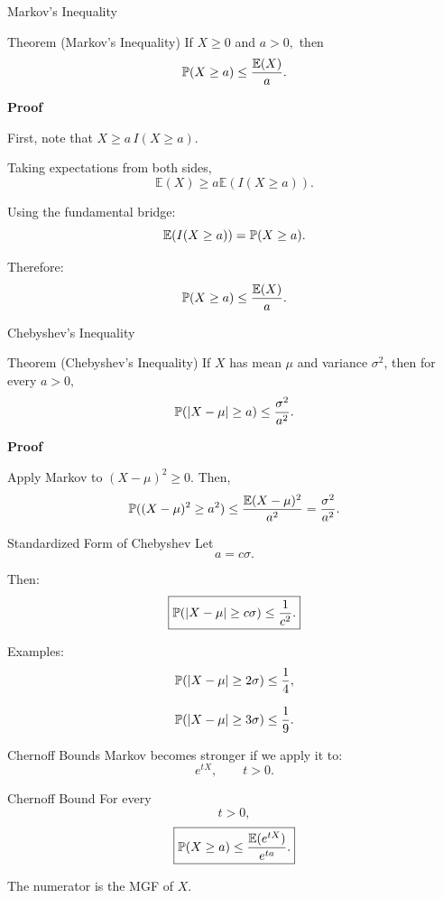 \begin{frame}{Markov's Inequality}
\begin{keybox}{Theorem (Markov's Inequality)}
If $X\ge0$ and $a>0,$ then
\[
{
\mathbb{P}(X\ge a)
\le
\frac{\mathbb{E}(X)}{a}.
}
\]
\end{keybox}

\textbf{Proof}

First, note that $X
\ge
a\,I(X\ge a).$

Taking expectations from both sides,
\[
\mathbb{E}(X)
\ge
a\mathbb{E}(I(X\ge a)).
\]

Using the fundamental bridge:
\[
\mathbb{E}(I(X\ge a))
=
\mathbb{P}(X\ge a).
\]

Therefore:
\[
{
\mathbb{P}(X\ge a)
\le
\frac{\mathbb{E}(X)}{a}.
}
\]

\end{frame}



\begin{frame}{Chebyshev's Inequality}
\begin{keybox}{Theorem (Chebyshev's Inequality)}
If $X$ has mean $\mu$ and variance $\sigma^2$, then for every $a>0,$
\[
{
\mathbb{P}(|X-\mu|\ge a)
\le
\frac{\sigma^2}{a^2}.
}
\]
\end{keybox}
\textbf{Proof}

Apply Markov to $(X-\mu)^2\geq 0.$ Then,
\[
\mathbb{P}((X-\mu)^2\ge a^2)
\le
\frac{
\mathbb{E}(X-\mu)^2
}{
a^2 
}=\frac{\sigma^2}{a^2}.
\]
\end{frame}



\begin{frame}{Standardized Form of Chebyshev}
Let
\[
a=c\sigma.
\]

Then:
\[
\boxed{
\mathbb{P}(|X-\mu|\ge c\sigma)
\le
\frac1{c^2}.
}
\]

\vspace{0.25cm}

Examples:
\[
\mathbb{P}(|X-\mu|\ge2\sigma)\le\frac14,
\]

\[
\mathbb{P}(|X-\mu|\ge3\sigma)\le\frac19.
\]
\end{frame}

\begin{frame}{Chernoff Bounds}
Markov becomes stronger if we apply it to:
\[
e^{tX},
\qquad t>0.
\]

\vspace{0.25cm}

\begin{keybox}{Chernoff Bound}
For every
\[
t>0,
\]
\[
\boxed{
\mathbb{P}(X\ge a)
\le
\frac{
\mathbb{E}(e^{tX})
}{
e^{ta}
}.
}
\]
\end{keybox}

\vspace{0.25cm}

The numerator is the MGF of $X$.
\end{frame}
 

